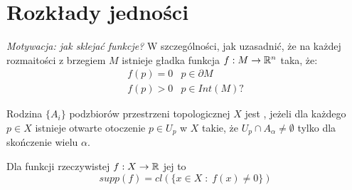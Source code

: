 \section{Rozkłady jedności}
\emph{Motywacja: jak sklejać funkcje?} W szczególności, jak uzasadnić, że na każdej rozmaitości z brzegiem $M$ istnieje gładka funkcja $f:M\to\mathbb{R}^n$ taka, że:
$$
\begin{matrix}
f(p)=0 & p\in\partial M\\
f(p)>0 & p\in Int(M)?
\end{matrix}
$$

\begin{definition}
Rodzina $\{A_i\}$ podzbiorów przestrzeni topologicznej $X$ jest , jeżeli dla każdego $p\in X$ istnieje otwarte otoczenie $p\in U_p$ w $X$ takie, że $U_p\cap A_\alpha\neq\emptyset$ tylko dla skończenie wielu $\alpha$.
\end{definition}

\begin{definition}
Dla funkcji rzeczywistej $f:X\to\mathbb{R}$ jej  to
$$supp(f)=cl(\{x\in X\;:\;f(x)\neq0\})$$
\end{definition}
